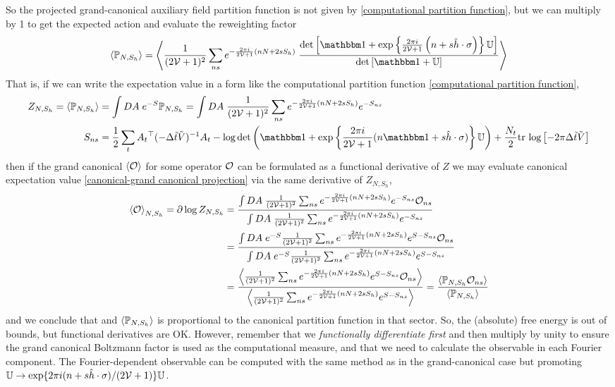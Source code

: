 So the projected grand-canonical auxiliary field partition function is not given by \eqref{computational partition function}, but we can multiply by 1 to get the expected action and evaluate the reweighting factor
\begin{align}
    \expectation{\PP_{N, S_h}}
    =
    \expectation{
        \oneover{(2\Volume+1)^2} \sum_{ns} e^{-\frac{2\pi i}{2\Volume+1} (nN+2sS_h)}\; \frac{
            \det\left[ \one + \exp\left\{ \frac{2\pi i}{2\Volume+1}\left(n + s \hat{h} \cdot \sigma\right)\right\} \UU\right]
        }{
            \det\left[ \one + \UU \right]
        }
    }
    \label{eq:grand canonical projector representation}
\end{align}
That is, if we can write the expectation value in a form like the computational partition function \eqref{computational partition function},
\begin{align}
    Z_{N, S_h} = \expectation{\PP_{N,S_h}} &= \int DA\; e^{-S} \PP_{N, S_h} = \int DA\; \oneover{(2\Volume+1)^2}\sum_{ns} e^{-\frac{2\pi i}{2\Volume+1}(nN+2sS_h)} e^{-S_{ns}}
    \\
    S_{ns} &= \half \sum_{t} A_t\transpose (-\Delta\tilde{t}\tilde{V})\inverse A_t - \log\det\left(\one+\exp\left\{\frac{2\pi i}{2\Volume+1}(n\one+s \hat{h}\cdot\sigma)\right\}\UU\right) + \frac{N_t}{2} \trlog{ -2\pi \Delta\tilde{t}\tilde{V}}
\end{align}
then if the grand canonical $\left\langle \mathcal{O} \right\rangle$ for some operator $\mathcal{O}$ can be formulated as a functional derivative of $Z$ we may evaluate canonical expectation value \eqref{canonical-grand canonical projection} via the same derivative of $Z_{N, S_h}$,
\begin{align}
    \left\langle \mathcal{O} \right\rangle_{N,S_h} = \partial \log Z_{N, S_h}
    &= \frac{\int DA\; \frac{1}{(2\mathcal{V}+1)^2}\sum_{ns} e^{-\frac{2\pi i}{2\mathcal{V}+1}(nN+2sS_h)} e^{-S_{ns}} \mathcal{O}_{ns}}{\int DA\; \frac{1}{(2\mathcal{V}+1)^2}\sum_{ns} e^{-\frac{2\pi i}{2\mathcal{V}+1}(nN+2sS_h)} e^{-S_{ns}}}
    \nonumber\\
    &= \frac{\int DA\; e^{-S} \frac{1}{(2\mathcal{V}+1)^2}\sum_{ns} e^{-\frac{2\pi i}{2\mathcal{V}+1}(nN+2sS_h)} e^{S-S_{ns}} \mathcal{O}_{ns}}{\int DA\; e^{-S}\frac{1}{(2\mathcal{V}+1)^2}\sum_{ns} e^{-\frac{2\pi i}{2\mathcal{V}+1}(nN+2sS_h)} e^{S-S_{ns}}}
    \nonumber\\
    &= \frac{\left\langle \frac{1}{(2\mathcal{V}+1)^2}\sum_{ns} e^{-\frac{2\pi i}{2\mathcal{V}+1}(nN+2sS_h)} e^{S-S_{ns}} \mathcal{O}_{ns} \right\rangle}{\left\langle \frac{1}{(2\mathcal{V}+1)^2}\sum_{ns} e^{-\frac{2\pi i}{2\mathcal{V}+1}(nN+2sS_h)} e^{S-S_{ns}} \right\rangle}
    = \frac{\left\langle \mathbb{P}_{N,S_h} \mathcal{O}_{ns} \right\rangle}{\left\langle \mathbb{P}_{N,S_h} \right\rangle}
\end{align}
and we conclude that and $\left\langle \mathbb{P}_{N,S_h} \right\rangle$ is proportional to the canonical partition function in that sector.
So, the (absolute) free energy is out of bounds, but functional derivatives are OK.
However, remember that we \emph{functionally differentiate first} and then multiply by unity to ensure the grand canonical Boltzmann factor is used as the computational measure, and that we need to calculate the observable in each Fourier component.
The Fourier-dependent observable can be computed with the same method as in the grand-canonical case but promoting $\mathbb{U} \rightarrow \exp\{2\pi i(n+s\hat{h}\cdot\sigma)/(2\mathcal{V}+1)\}\mathbb{U}$.

